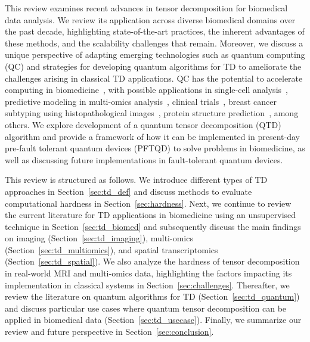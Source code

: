 This review examines recent advances in tensor decomposition for biomedical data analysis. We review its application across diverse biomedical domains over the past decade, highlighting state-of-the-art practices, the inherent advantages of these methods, and the scalability challenges that remain. Moreover, we discuss a unique perspective of adapting emerging technologies such as quantum computing (QC) and strategies for developing quantum algorithms for TD to ameliorate the challenges arising in classical TD applications. QC has the potential to accelerate computing in biomedicine~\cite{durant2024primer, flother2024quantum, emani2021quantum, nalkecz2024quantum}, with possible applications in single-cell analysis~\cite{basu2023towards,utro2024perspective}, predictive modeling in multi-omics analysis~\cite{bose2024quantum}, clinical trials~\cite{doga2024can}, breast cancer subtyping using histopathological images~\cite{ray2024hybrid}, protein structure prediction~\cite{doga2024perspective, raubenolt2023quantum}, among others. We explore development of a quantum tensor decomposition (QTD) algorithm and provide a framework of how it can be implemented in present-day pre-fault tolerant quantum devices (PFTQD) to solve problems in biomedicine, as well as discussing future implementations in fault-tolerant quantum devices.

This review is structured as follows. We introduce different types of TD approaches in Section~\ref{sec:td_def} and discuss methods to evaluate computational hardness in Section~\ref{sec:hardness}. Next, we continue to review the current literature for TD applications in biomedicine using an unsupervised technique in Section~\ref{sec:td_biomed} and subsequently discuss the main findings on imaging (Section~\ref{sec:td_imaging}), multi-omics (Section~\ref{sec:td_multiomics}), and spatial transcriptomics (Section~\ref{sec:td_spatial}). We also analyze the hardness of tensor decomposition in real-world MRI and multi-omics data, highlighting the factors impacting its implementation in classical systems in Section~\ref{sec:challenges}. Thereafter, we review the literature on quantum algorithms for TD (Section~\ref{sec:td_quantum}) and discuss particular use cases where quantum tensor decomposition can be applied in biomedical data (Section~\ref{sec:td_usecase}). Finally, we summarize our review and future perspective in Section~\ref{sec:conclusion}.  

